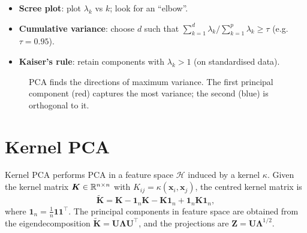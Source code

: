 \begin{bestpractice}[title=\textbf{Selecting the Number of Components}]
\begin{itemize}
  \item \textbf{Scree plot}: plot $\lambda_k$ vs $k$; look for an ``elbow''.
  \item \textbf{Cumulative variance}: choose $d$ such that $\sum_{k=1}^d\lambda_k/\sum_{k=1}^p\lambda_k\geq\tau$ (e.g.\ $\tau=0.95$).
  \item \textbf{Kaiser's rule}: retain components with $\lambda_k>1$ (on standardised data).
\end{itemize}
\end{bestpractice}

\begin{figure}[ht]
\centering
{}
\caption{PCA finds the directions of maximum variance. The first principal component (red) captures the most variance; the second (blue) is orthogonal to it.}
\label{fig:pca-projection}
\end{figure}

\section{Kernel PCA}

\begin{definition}
Kernel PCA performs PCA in a feature space $\mathcal{H}$ induced by a kernel $\kappa$. Given the kernel matrix $\bm{K}\in\mathbb{R}^{n\times n}$ with $K_{ij}=\kappa(\bm{x}_i,\bm{x}_j)$, the centred kernel matrix is
\[
  \tilde{\bm{K}} = \bm{K} - \bm{1}_n\bm{K} - \bm{K}\bm{1}_n + \bm{1}_n\bm{K}\bm{1}_n,
\]
where $\bm{1}_n = \frac{1}{n}\bm{11}^\top$. The principal components in feature space are obtained from the eigendecomposition $\tilde{\bm{K}}=\bm{U}\bm{\Lambda}\bm{U}^\top$, and the projections are $\bm{Z}=\bm{U}\bm{\Lambda}^{1/2}$.
\end{definition}

